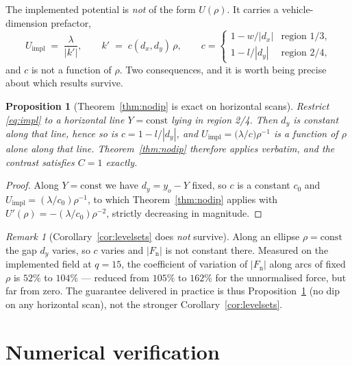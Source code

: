 \documentclass[11pt]{article}
\newtheorem{proposition}[theorem]{Proposition}
\theoremstyle{remark}
\newtheorem{remark}[theorem]{Remark}
\begin{document}
The implemented potential is \emph{not} of the form $U(\rho)$. It carries a
vehicle-dimension prefactor,
\begin{equation}
  U_{\mathrm{impl}} \;=\; \frac{\lambda}{\bigl|k'\bigr|},
  \qquad
  k' \;=\; c(d_{x},d_{y})\,\rho,
  \qquad
  c=\begin{cases}
      1-w/|d_{x}| & \text{region 1/3},\\
      1-l/|d_{y}| & \text{region 2/4},
    \end{cases}
  \label{eq:impl}
\end{equation}
and $c$ is not a function of $\rho$. Two consequences, and it is worth being
precise about which results survive.

\begin{proposition}[Theorem~\ref{thm:nodip} is exact on horizontal scans]
\label{prop:horizontal}
Restrict \eqref{eq:impl} to a horizontal line $Y=\text{const}$ lying in
region 2/4. Then $d_{y}$ is constant along that line, hence so is
$c=1-l/|d_{y}|$, and $U_{\mathrm{impl}}=\bigl(\lambda/c\bigr)\rho^{-1}$ is a
function of $\rho$ alone \emph{along that line}. Theorem~\ref{thm:nodip}
therefore applies verbatim, and the contrast satisfies $C=1$ exactly.
\end{proposition}

\begin{proof}
Along $Y=\text{const}$ we have $d_{y}=y_{o}-Y$ fixed, so $c$ is a constant
$c_{0}$ and $U_{\mathrm{impl}}=(\lambda/c_{0})\rho^{-1}$, to which
Theorem~\ref{thm:nodip} applies with $U'(\rho)=-(\lambda/c_{0})\rho^{-2}$,
strictly decreasing in magnitude.
\end{proof}

\begin{remark}[Corollary~\ref{cor:levelsets} does \emph{not} survive]
\label{rem:notlevelsets}
Along an ellipse $\rho=\text{const}$ the gap $d_{y}$ varies, so $c$ varies and
$|F_{\mathrm{n}}|$ is not constant there. Measured on the implemented field
at $q=15$, the coefficient of variation of $|F_{\mathrm{n}}|$ along arcs of
fixed $\rho$ is $52\%$ to $104\%$ --- reduced from $105\%$ to $162\%$ for the
unnormalised force, but far from zero. The guarantee delivered in practice is
thus Proposition~\ref{prop:horizontal} (no dip on any horizontal scan), not
the stronger Corollary~\ref{cor:levelsets}.
\end{remark}

\section{Numerical verification}
\end{document}
